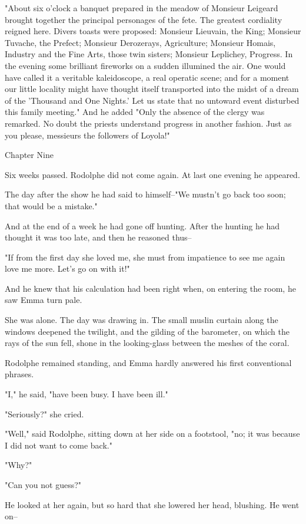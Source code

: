 \documentclass{tufte-book}
\begin{document}
"About six o'clock a banquet prepared in the meadow of Monsieur Leigeard
brought together the principal personages of the fete. The greatest
cordiality reigned here. Divers toasts were proposed: Monsieur
Lieuvain, the King; Monsieur Tuvache, the Prefect; Monsieur Derozerays,
Agriculture; Monsieur Homais, Industry and the Fine Arts, those twin
sisters; Monsieur Leplichey, Progress. In the evening some brilliant
fireworks on a sudden illumined the air. One would have called it a
veritable kaleidoscope, a real operatic scene; and for a moment our
little locality might have thought itself transported into the midst of
a dream of the 'Thousand and One Nights.' Let us state that no untoward
event disturbed this family meeting." And he added "Only the absence
of the clergy was remarked. No doubt the priests understand progress in
another fashion. Just as you please, messieurs the followers of Loyola!"



Chapter Nine

Six weeks passed. Rodolphe did not come again. At last one evening he
appeared.

The day after the show he had said to himself--"We mustn't go back too
soon; that would be a mistake."

And at the end of a week he had gone off hunting. After the hunting he
had thought it was too late, and then he reasoned thus--

"If from the first day she loved me, she must from impatience to see me
again love me more. Let's go on with it!"

And he knew that his calculation had been right when, on entering the
room, he saw Emma turn pale.

She was alone. The day was drawing in. The small muslin curtain along
the windows deepened the twilight, and the gilding of the barometer, on
which the rays of the sun fell, shone in the looking-glass between the
meshes of the coral.

Rodolphe remained standing, and Emma hardly answered his first
conventional phrases.

"I," he said, "have been busy. I have been ill."

"Seriously?" she cried.

"Well," said Rodolphe, sitting down at her side on a footstool, "no; it
was because I did not want to come back."

"Why?"

"Can you not guess?"

He looked at her again, but so hard that she lowered her head, blushing.
He went on--
\end{document}
